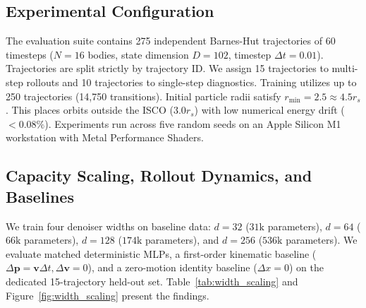 \documentclass[11pt,a4paper]{article}
\begin{document}
\subsection{Experimental Configuration}
The evaluation suite contains 275 independent Barnes-Hut trajectories of 60 timesteps ($N=16$ bodies, state dimension $D=102$, timestep $\Delta t = 0.01$). Trajectories are split strictly by trajectory ID. We assign 15 trajectories to multi-step rollouts and 10 trajectories to single-step diagnostics. Training utilizes up to 250 trajectories (14,750 transitions). Initial particle radii satisfy $r_{\min} = 2.5 \approx 4.5 r_s$. This places orbits outside the ISCO ($3.0 r_s$) with low numerical energy drift ($<0.08\%$). Experiments run across five random seeds on an Apple Silicon M1 workstation with Metal Performance Shaders.

\subsection{Capacity Scaling, Rollout Dynamics, and Baselines}
We train four denoiser widths on baseline data: $d=32$ ($31\text{k}$ parameters), $d=64$ ($66\text{k}$ parameters), $d=128$ ($174\text{k}$ parameters), and $d=256$ ($536\text{k}$ parameters). We evaluate matched deterministic MLPs, a first-order kinematic baseline ($\Delta \mathbf{p} = \mathbf{v} \Delta t, \Delta \mathbf{v} = 0$), and a zero-motion identity baseline ($\Delta x = 0$) on the dedicated 15-trajectory held-out set. Table~\ref{tab:width_scaling} and Figure~\ref{fig:width_scaling} present the findings.

\begin{table}[H]
\centering
\small
\caption{\textbf{Empirical Evaluation Across Model Widths Over 5 Random Seeds on Baseline Dataset.} Values report mean $\pm$ standard deviation over 5 seeds on held-out trajectories. Columns show validation loss, 30-step diffusion rollout error, matched deterministic MLP error, and fixed reference baselines with $95\%$ bootstrap confidence intervals.}
\label{tab:width_scaling}
\end{table}
\end{document}
